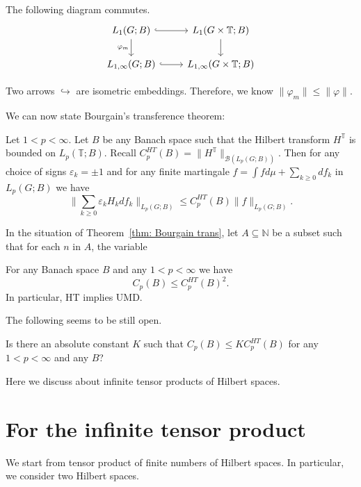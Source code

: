     The following diagram commutes. 
    \[\begin{tikzcd}
        L_1(G;B) \arrow[d, "\varphi_m"'] \arrow[r, hook] & L_1(G\times\mathbb{T};B) \arrow[d]  \\
        {L_{1,\infty}(G;B)} \arrow[r, hook]              & {L_{1,\infty}(G\times\mathbb{T};B)}
    \end{tikzcd}\]

    Two arrows $\hookrightarrow$ are isometric embeddings. Therefore, we know $\|\varphi_m\| \leq \|\varphi \| $.

We can now state Bourgain’s transference theorem:
\begin{theorem}\label{thm: Bourgain trans}
    Let $1 < p < \infty$. Let $B$ be any Banach space such that the Hilbert transform $H^{\mathbb{T}}$ is 
    bounded on $L_p(\mathbb{T};B)$. Recall $C_p^{HT}(B)=\|H^{\mathbb{T}}\|_{\mathcal{B}(L_p(G;B))}$. Then for any choice of signs 
    $\varepsilon_k=\pm1$ and for any finite martingale $f=\int fd\mu+\sum_{k\geq0}df_k$ in $L_p(G;B)$ we have
        \[  \|\sum_{k\geq0}\varepsilon_k H_k df_k\|_{L_p(G;B)}\leq C_p^{HT}(B)\|f\|_{L_p(G;B)}. \]
\end{theorem}

\begin{corollary}
    In the situation of Theorem~\ref{thm: Bourgain trans}, let $A\subseteq\mathbb{N}$ be a subset such
    that for each $n$ in $A$, the variable
\end{corollary}

\begin{corollary}
    For any Banach space $B$ and any $1 < p < \infty$ we have
        \[  C_p(B) \leq C_p^{HT}(B)^2.  \]
    In particular, HT implies UMD.
\end{corollary}

The following seems to be still open.
\begin{problem}
    Is there an absolute constant $K$ such that $C_p(B) \leq K C_p^{HT} (B)$ for
any $1 < p < \infty$ and any $B$?
\end{problem}

\appendix

Here we discuss about infinite tensor products of Hilbert spaces.

\section{For the infinite tensor product}
We start from tensor product of finite numbers of Hilbert spaces. In particular, we consider two Hilbert spaces.


